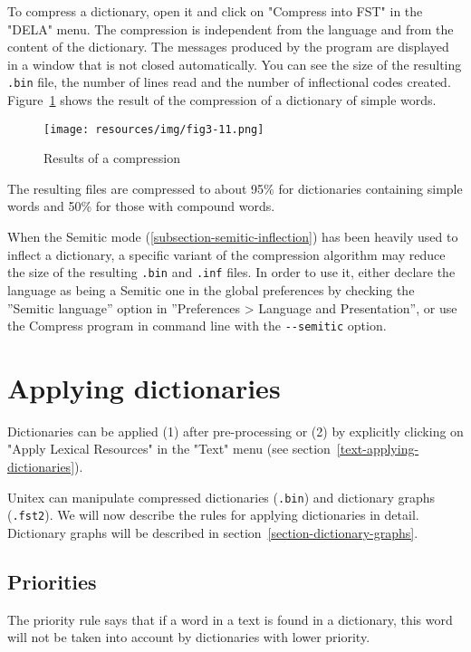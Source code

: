 \noindent To compress a dictionary, open it and click on "Compress into FST" in
the "DELA" menu. The compression is independent from the language and from the content of
the dictionary. The messages produced by the program are displayed in a window
that is not closed automatically. You can see the size of the resulting
\verb+.bin+ file, the number of lines read and the number of inflectional codes
created. Figure~\ref{fig-compression-result} shows the result of
the compression of a dictionary of simple words. \bigskip
\begin{figure}[!ht]
\begin{center}
\texttt{[image: resources/img/fig3-11.png]}
\caption{Results of a compression\label{fig-compression-result}}
\end{center}
\end{figure}

\bigskip
\noindent The resulting files are compressed to about 95\% for dictionaries containing
simple words and 50\% for those with compound words.

\bigskip
\noindent When the Semitic mode (\ref{subsection-semitic-inflection}) has been heavily used
to inflect a dictionary, a specific variant of the compression algorithm may reduce the size of the
resulting \verb+.bin+ and \verb+.inf+ files. In order to use it, either declare the language as
being a Semitic one in the global preferences by checking the ''Semitic language'' option in
''Preferences > Language and Presentation'', or use the Compress program in command line with the
\verb+--semitic+ option.


\section{Applying dictionaries}
\label{section-applying-dictionaries}
Dictionaries can be applied (1) after pre-processing or (2) by explicitly 
clicking on "Apply Lexical Resources" in the  "Text" menu (see
section~\ref{text-applying-dictionaries}).

\bigskip
\noindent Unitex can manipulate compressed dictionaries (\verb+.bin+) and
dictionary graphs (\verb+.fst2+). We will now describe  the rules for applying dictionaries
in detail. Dictionary graphs will be described in
section~\ref{section-dictionary-graphs}.

\subsection{Priorities}
\label{section-dictionary-priorities}
The priority rule says that  if a word in a text is found in a dictionary, this
word will not be taken into account by dictionaries with lower priority.

